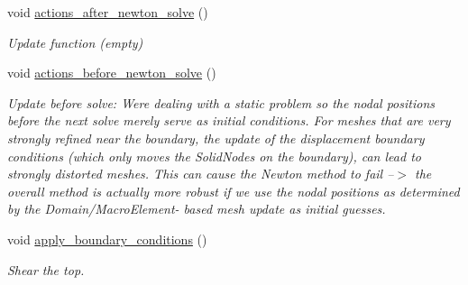 \begin{DoxyCompactItemize}
void \hyperlink{classSimpleShearProblem_ab476064967687537e335dfd40d770dbc}{actions\+\_\+after\+\_\+newton\+\_\+solve} ()
\begin{DoxyCompactList}\small\item\em Update function (empty) \end{DoxyCompactList}\item 
void \hyperlink{classSimpleShearProblem_a2c63e1a6c120da147b0c4ec9764e1510}{actions\+\_\+before\+\_\+newton\+\_\+solve} ()
\begin{DoxyCompactList}\small\item\em Update before solve\+: We\textquotesingle{}re dealing with a static problem so the nodal positions before the next solve merely serve as initial conditions. For meshes that are very strongly refined near the boundary, the update of the displacement boundary conditions (which only moves the Solid\+Nodes {\itshape on} the boundary), can lead to strongly distorted meshes. This can cause the Newton method to fail --$>$ the overall method is actually more robust if we use the nodal positions as determined by the Domain/\+Macro\+Element-\/ based mesh update as initial guesses. \end{DoxyCompactList}\item 
void \hyperlink{classSimpleShearProblem_a1069985934b36d269b4bc8cb3ba00902}{apply\+\_\+boundary\+\_\+conditions} ()
\begin{DoxyCompactList}\small\item\em Shear the top. \end{DoxyCompactList}\end{DoxyCompactItemize}
